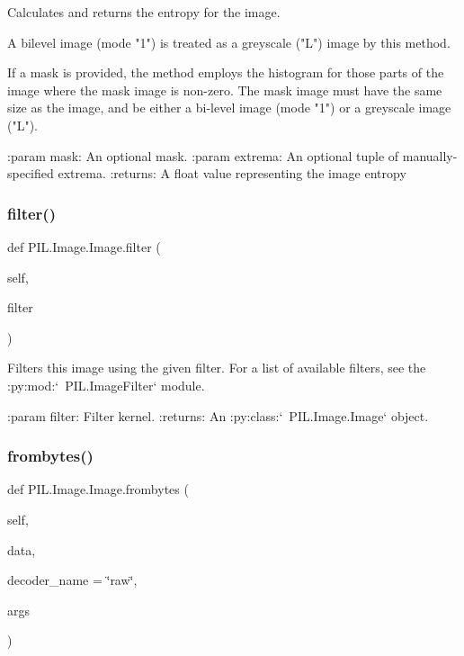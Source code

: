 \begin{DoxyVerb}Calculates and returns the entropy for the image.

A bilevel image (mode "1") is treated as a greyscale ("L")
image by this method.

If a mask is provided, the method employs the histogram for
those parts of the image where the mask image is non-zero.
The mask image must have the same size as the image, and be
either a bi-level image (mode "1") or a greyscale image ("L").

:param mask: An optional mask.
:param extrema: An optional tuple of manually-specified extrema.
:returns: A float value representing the image entropy
\end{DoxyVerb}
 \mbox{\label{classPIL_1_1Image_1_1Image_a0a180c133e6c5d5a0fd5fe0942bfb366}} 
\subsubsection{\texorpdfstring{filter()}{filter()}}
{\footnotesize\ttfamily def P\+I\+L.\+Image.\+Image.\+filter (\begin{DoxyParamCaption}\item[{}]{self,  }\item[{}]{filter }\end{DoxyParamCaption})}

\begin{DoxyVerb}Filters this image using the given filter.  For a list of
available filters, see the :py:mod:`~PIL.ImageFilter` module.

:param filter: Filter kernel.
:returns: An :py:class:`~PIL.Image.Image` object.\end{DoxyVerb}
 \mbox{\label{classPIL_1_1Image_1_1Image_a6e29e9d9b28b90721e56a6526475a194}} 
\subsubsection{\texorpdfstring{frombytes()}{frombytes()}}
{\footnotesize\ttfamily def P\+I\+L.\+Image.\+Image.\+frombytes (\begin{DoxyParamCaption}\item[{}]{self,  }\item[{}]{data,  }\item[{}]{decoder\+\_\+name = {\ttfamily \char`\"{}raw\char`\"{}},  }\item[{}]{args }\end{DoxyParamCaption})}

